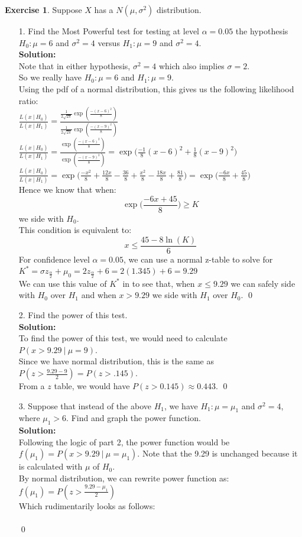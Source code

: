 \documentclass[11pt]{article}
\theoremstyle{definition}
\newtheorem{exercise}[theorem]{Exercise}
\newcommand{\st}{\ |\ }
\newcommand{\V}{\vspace{0.3cm}\\}
\newcommand{\sol}{\V \textbf{Solution:} \V}
\begin{document}
\newpage
\begin{exercise} Suppose $X$ has a $N(\mu, \sigma^2)$ distribution. 
\begin{enumerate}
\item[1.] Find the Most Powerful test for testing at level $\alpha = 0.05$ the hypothesis $H_0 : \mu = 6$ and $\sigma^2 = 4$ versus $H_1 : \mu = 9$ and $\sigma^2 = 4$. \sol
Note that in either hypothesis, $\sigma^2 = 4$ which also implies $\sigma = 2$. \V
So we really have $H_0: \mu = 6$ and $H_1: \mu = 9$. \V
Using the pdf of a normal distribution, this gives us the following likelihood ratio: \V
$\displaystyle \frac{L(x \st H_0)}{ L (x \st H_1)} = \frac{\frac{1}{2\sqrt{2\pi}} \exp(\frac{-(x-6)^2}{8})}{\frac{1}{2\sqrt{2\pi}} \exp(\frac{-(x-9)^2}{8})}$\V
$\displaystyle \frac{L(x \st H_0)}{ L (x \st H_1)} = \frac{ \exp(\frac{-(x-6)^2}{8})}{ \exp(\frac{-(x-9)^2}{8})} = \exp \Big(\frac{-1}{8} (x-6)^2 + \frac{1}{8} (x-9)^2\Big)$\V
$\displaystyle \frac{L(x \st H_0)}{ L (x \st H_1)} = \exp\Big(\frac{-x^2}{8} + \frac{12x}{8} - \frac{36}{8} + \frac{x^2}{8} - \frac{18x}{8} + \frac{81}{8}\Big) = \exp\Big(\frac{-6x}{8} + \frac{45}{8} \Big)$\V
Hence we know that when:\\
$$\exp\Big(\frac{-6x+45}{8}\Big) \geq K$$
we side with $H_0$. \\
This condition is equivalent to:\\
$$x \leq \frac{45-8\ln(K)}{6} $$
For confidence level $\alpha = 0.05$, we can use a normal z-table to solve for $K^* = \sigma z_{\frac{\alpha}{2}} + \mu_0 = 2 z_{\frac{\alpha}{2}} + 6 = 2(1.345) + 6 = 9.29$\V
We can use this value of $K^*$ in to see that, when $x \leq 9.29$ we can safely side with $H_0$ over $H_1$ and when $x > 9.29$ we side with $H_1$ over $H_0$.   \qed \newpage
\item[2.] Find the power of this test. \sol
To find the power of this test, we would need to calculate $P(x > 9.29 \st \mu=9)$. \V
Since we have normal distribution, this is the same as $P(z > \frac{9.29-9}{2}) = P(z > .145)$. \V
From a $z$ table, we would have $P(z> 0.145) \approx 0.443$. \qed

\item[3.] Suppose that instead of the above $H_1$, we have $H_1 : \mu = \mu_1$ and $\sigma^2 = 4$, where $\mu_1 > 6$. Find and graph the power function. \sol
Following the logic of part 2, the power function would be $f(\mu_1) = P(x > 9.29 \st \mu = \mu_1)$. Note that the 9.29 is unchanged because it is calculated with $\mu$ of $H_0$. \V
By normal distribution, we can rewrite power function as:\V
$f(\mu_1) = P(z > \frac{9.29-\mu_1}{2})$\V
Which rudimentarily looks as follows: \\ \vspace{5cm} \\ \qed
\end{enumerate}
\end{exercise}
\end{document}
